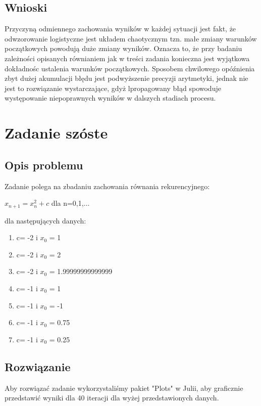 \documentclass[8pt,letterpaper]{article}
\begin{document}
\subsection{Wnioski}

\hspace{1.0 cm}Przyczyną odmiennego zachowania wyników w każdej sytuacji jest fakt, że odwzorowanie logistyczne jest układem chaotycznym tzn. małe zmiany warunków początkowych powodują duże zmiany wyników. Oznacza to, że przy badaniu zależności opisanych równianiem jak w treści zadania konieczna jest wyjątkowa dokładnośc ustalenia warunków początkowych. Sposobem chwilowego opóźnienia zbyt dużej akumulacji błędu jest podwyższenie precyzji arytmetyki, jednak nie jest to rozwiązanie wystarczające, gdyż lpropagowany błąd spowoduje występowanie niepoprawnych wyników w dalszych stadiach procesu.

\section{Zadanie szóste}
\subsection{Opis problemu}
\hspace{1.0 cm}Zadanie polega na zbadaniu zachowania równania rekurencyjnego:
\begin{center}
$x_{n+1} = x_{n}^{2}+c$ dla n=0,1,$\dots$
\end{center}
dla następujących danych:

\begin{enumerate}
\item c= -2 i $x_{0}$ = 1
\item c= -2 i $x_{0}$ = 2
\item c= -2 i $x_{0}$ = 1.99999999999999
\item c= -1 i $x_{0}$ = 1
\item c= -1 i $x_{0}$ = -1
\item c= -1 i $x_{0}$ = 0.75
\item c= -1 i $x_{0}$ = 0.25
\end{enumerate}



\subsection{Rozwiązanie}
\hspace{1.0 cm}Aby rozwiązać zadanie wykorzystaliśmy pakiet "Plots" w Julii, aby graficznie przedstawić wyniki dla 40 iteracji dla wyżej przedstawionych danych.
\end{document}
